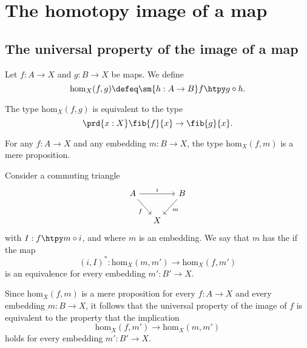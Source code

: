 \chapter{The homotopy image of a map}\label{chap:image}
\section{The universal property of the image of a map}

\begin{defn}
Let $f:A\to X$ and $g:B\to X$ be maps. We define
\begin{equation*}
\mathrm{hom}_X(f,g)\defeq\sm{h:A\to B}f\htpy g\circ h.
\end{equation*}
\end{defn}

\begin{rmk}
The type $\mathrm{hom}_X(f,g)$ is equivalent to the type
\begin{equation*}
\prd{x:X}\fib{f}{x}\to\fib{g}{x}.
\end{equation*}
\end{rmk}

\begin{lem}
For any $f:A\to X$ and any embedding $m:B\to X$, the type $\mathrm{hom}_X(f,m)$ is a mere proposition.
\end{lem}

\begin{defn}
Consider a commuting triangle
\begin{equation*}
\begin{tikzcd}[column sep=small]
A \arrow[rr,"i"] \arrow[dr,swap,"f"] & & B \arrow[dl,"m"] \\
& X
\end{tikzcd}
\end{equation*}
with $I:f\htpy m\circ i$, and where $m$ is an embedding.
We say that $m$ has the  if the map
\begin{equation*}
(i,I)^\ast : \mathrm{hom}_X(m,m')\to\mathrm{hom}_X(f,m')
\end{equation*}
is an equivalence for every embedding $m':B'\to X$. 
\end{defn}

\begin{rmk}
Since $\mathrm{hom}_X(f,m)$ is a mere proposition for every $f:A\to X$ and every embedding $m:B\to X$, it follows that the universal property of the image of $f$ is equivalent to the property that the implication
\begin{equation*}
\mathrm{hom}_X(f,m')\to\mathrm{hom}_X(m,m')
\end{equation*}
holds for every embedding $m':B'\to X$. 
\end{rmk}

